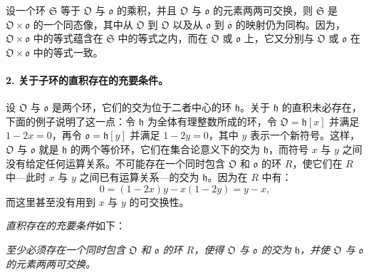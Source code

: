 设一个环 \(\mathfrak S\) 等于 \(\mathfrak O\) 与 \(\mathfrak o\) 的乘积，并且 \(\mathfrak O\) 与 \(\mathfrak o\) 的元素两两可交换，则 \(\mathfrak S\) 是 \(\mathfrak O\times\mathfrak o\) 的一个同态像，其中从 \(\mathfrak O\) 到 \(\overline{\mathfrak O}\) 以及从 \(\mathfrak o\) 到 \(\overline{\mathfrak o}\) 的映射仍为同构。因为，\(\mathfrak O\times\mathfrak o\) 中的等式蕴含在 \(\mathfrak S\) 中的等式之内，而在 \(\mathfrak O\) 或 \(\mathfrak o\) 上，它又分别与 \(\mathfrak O\) 或 \(\mathfrak o\) 在 \(\mathfrak O\times\mathfrak o\) 中的等式一致。

\paragraph{2. 关于子环的直积存在的充要条件。}
设 \(\mathfrak O\) 与 \(\mathfrak o\) 是两个环，它们的交为位于二者中心的环 \(\mathfrak h\)。关于 \(\mathfrak h\) 的直积未必存在，下面的例子说明了这一点：令 \(\mathfrak h\) 为全体有理整数所成的环，令 \(\mathfrak O=\mathfrak h[x]\) 并满足 \(1-2x=0\)，再令 \(\mathfrak o=\mathfrak h[y]\) 并满足 \(1-2y=0\)，其中 \(y\) 表示一个新符号。这样，\(\mathfrak O\) 与 \(\mathfrak o\) 就是 \(\mathfrak h\) 的两个等价环，它们在集合论意义下的交为 \(\mathfrak h\)，而符号 \(x\) 与 \(y\) 之间没有给定任何运算关系。不可能存在一个同时包含 \(\mathfrak O\) 和 \(\mathfrak o\) 的环 \(R\)，使它们在 \(R\) 中---此时 \(x\) 与 \(y\) 之间已有运算关系---的交为 \(\mathfrak h\)。因为在 \(R\) 中有：
\[
0=(1-2x)y-x(1-2y)=y-x,
\]
而这里甚至没有用到 \(x\) 与 \(y\) 的可交换性。

\emph{直积存在的充要条件}如下：

\emph{至少必须存在一个同时包含 \(\mathfrak O\) 和 \(\mathfrak o\) 的环 \(R\)，使得 \(\mathfrak O\) 与 \(\mathfrak o\) 的交为 \(\mathfrak h\)，并使 \(\mathfrak O\) 与 \(\mathfrak o\) 的元素两两可交换。}

